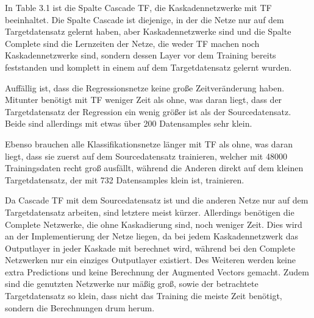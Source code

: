 In Table 3.1 ist die Spalte Cascade TF, die Kaskadennetzwerke mit TF beeinhaltet. Die Spalte Cascade ist diejenige, in der die Netze nur auf dem 
Targetdatensatz gelernt haben, aber Kaskadennetzwerke sind und die Spalte Complete sind die Lernzeiten der Netze, die weder TF machen noch 
Kaskadennetzwerke sind, sondern dessen Layer vor dem Training bereits feststanden und komplett in einem auf dem Targetdatensatz gelernt wurden. 

Auffällig ist, dass die Regressionsnetze keine große Zeitveränderung haben. Mitunter benötigt mit TF weniger Zeit als ohne, was daran liegt, dass 
der Targetdatensatz der Regression ein wenig größer ist als der Sourcedatensatz. Beide sind allerdings mit etwas über 200 Datensamples sehr klein. 

Ebenso brauchen alle Klassifikationsnetze länger mit TF als ohne, was daran liegt, dass sie zuerst auf dem Sourcedatensatz trainieren, welcher mit 
48000 Trainingsdaten recht groß ausfällt, während die Anderen direkt auf dem kleinen Targetdatensatz, der mit 732 Datensamples klein ist, 
trainieren. 

Da Cascade TF mit dem Sourcedatensatz ist und die anderen Netze nur auf dem Targetdatensatz arbeiten, sind letztere meist kürzer. Allerdings 
benötigen die Complete Netzwerke, die ohne Kaskadierung sind, noch weniger Zeit. Dies wird an der Implementierung der Netze liegen, da bei jedem 
Kaskadennetzwerk das Outputlayer in jeder Kaskade mit berechnet wird, während bei den Complete Netzwerken nur ein einziges Outputlayer existiert. 
Des Weiteren werden keine extra Predictions und keine Berechnung der Augmented Vectors gemacht. 
Zudem sind die genutzten Netzwerke nur mäßig groß, sowie der betrachtete Targetdatensatz so klein, dass nicht das Training die meiste Zeit 
benötigt, sondern die Berechnungen drum herum. 
